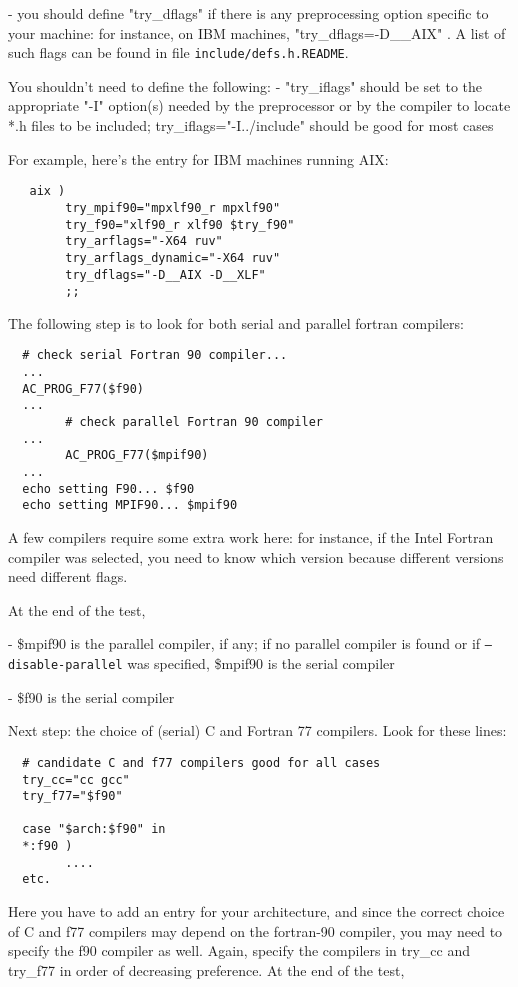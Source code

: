 \documentclass[12pt,a4paper]{article}
\begin{document}
\begin{enumerate}
- you should define "try\_dflags" if there is any preprocessing
option specific to your machine: for instance, on IBM machines,
"try\_dflags=-D\_\_AIX" . A list of such flags can be found in file
\texttt{include/defs.h.README}.

You shouldn't need to define the following:
- "try\_iflags" should be set to the appropriate "-I" option(s)
needed by the preprocessor or by the compiler to locate *.h files
to be included; try\_iflags="-I../include" should be good for most cases

For example, here's the entry for IBM machines running AIX:
\begin{verbatim}
   aix )
        try_mpif90="mpxlf90_r mpxlf90"
        try_f90="xlf90_r xlf90 $try_f90"
        try_arflags="-X64 ruv"
        try_arflags_dynamic="-X64 ruv"
        try_dflags="-D__AIX -D__XLF"
        ;;
\end{verbatim}
The following step is to look for both serial and parallel fortran
compilers:
\begin{verbatim}
  # check serial Fortran 90 compiler...
  ...
  AC_PROG_F77($f90)
  ...
        # check parallel Fortran 90 compiler
  ...
        AC_PROG_F77($mpif90)
  ...
  echo setting F90... $f90
  echo setting MPIF90... $mpif90
\end{verbatim}
A few compilers require some extra work here: for instance, if the
Intel Fortran compiler was selected, you need to know which version
because different versions need different flags.

At the end of the test,

- \$mpif90 is the parallel compiler, if any; if no parallel compiler
  is found or if \texttt{--disable-parallel} was specified, \$mpif90
  is the serial compiler

- \$f90 is the serial compiler

Next step: the choice of (serial) C and Fortran 77 compilers.
Look for these lines:
\begin{verbatim}
  # candidate C and f77 compilers good for all cases
  try_cc="cc gcc"
  try_f77="$f90"

  case "$arch:$f90" in
  *:f90 )
        ....
  etc.
\end{verbatim}
Here you have to add an entry for your architecture, and since the
correct choice of C and f77 compilers may depend on the fortran-90
compiler, you may need to specify the f90 compiler as well.
Again, specify the compilers in try\_cc and try\_f77 in order of
decreasing preference.  At the end of the test,


\end{enumerate}
\end{document}
